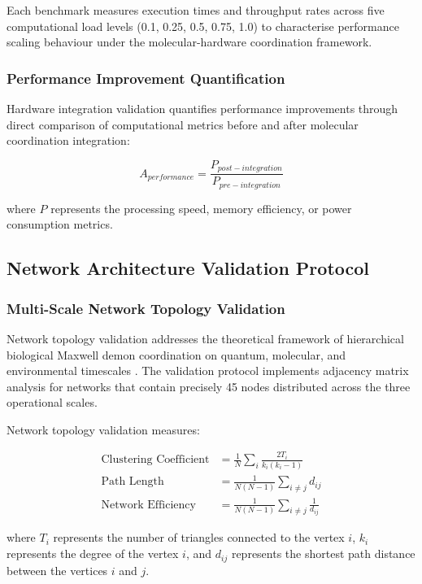 \documentclass[12pt,a4paper]{article}
\begin{document}
Each benchmark measures execution times and throughput rates across five computational load levels (0.1, 0.25, 0.5, 0.75, 1.0) to characterise performance scaling behaviour under the molecular-hardware coordination framework.

\subsubsection{Performance Improvement Quantification}

Hardware integration validation quantifies performance improvements through direct comparison of computational metrics before and after molecular coordination integration:

\begin{equation}
A_{performance} = \frac{P_{post-integration}}{P_{pre-integration}}
\end{equation}

where $P$ represents the processing speed, memory efficiency, or power consumption metrics.

\subsection{Network Architecture Validation Protocol}

\subsubsection{Multi-Scale Network Topology Validation}

Network topology validation addresses the theoretical framework of hierarchical biological Maxwell demon coordination on quantum, molecular, and environmental timescales \cite{mizraji2007biological,vedral2011living}. The validation protocol implements adjacency matrix analysis for networks that contain precisely 45 nodes distributed across the three operational scales.

Network topology validation measures:

\begin{align}
\text{Clustering Coefficient} &= \frac{1}{N} \sum_i \frac{2T_i}{k_i(k_i-1)} \\
\text{Path Length} &= \frac{1}{N(N-1)} \sum_{i \neq j} d_{ij} \\
\text{Network Efficiency} &= \frac{1}{N(N-1)} \sum_{i \neq j} \frac{1}{d_{ij}}
\end{align}

where $T_i$ represents the number of triangles connected to the vertex $i$, $k_i$ represents the degree of the vertex $i$, and $d_{ij}$ represents the shortest path distance between the vertices $i$ and $j$.
\end{document}
